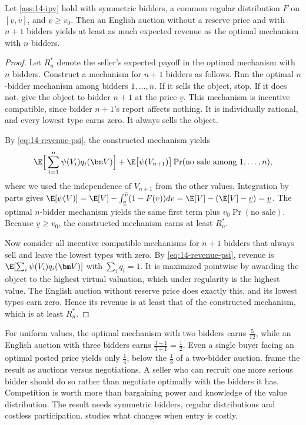 \begin{proposition}\label{prop:14-bk}
Let \cref{ass:14-ipv} hold with symmetric bidders, a common regular distribution $F$ on $[\underline v,\bar v]$, and $\underline v\ge v_0$. Then an English auction without a reserve price and with $n+1$ bidders yields at least as much expected revenue as the optimal mechanism with $n$ bidders.
\end{proposition}

\begin{proof}
Let $R_n^*$ denote the seller's expected payoff in the optimal mechanism with $n$ bidders. Construct a mechanism for $n+1$ bidders as follows. Run the optimal $n$-bidder mechanism among bidders $1,\dots,n$. If it sells the object, stop. If it does not, give the object to bidder $n+1$ at the price $\underline v$. This mechanism is incentive compatible, since bidder $n+1$'s report affects nothing. It is individually rational, and every lowest type earns zero. It always sells the object.

By \eqref{eq:14-revenue-psi}, the constructed mechanism yields
\[
\E\Big[\sum_{i=1}^n\psi(V_i)q_i(\bm V)\Big]+\E\big[\psi(V_{n+1})\big]\Pr(\text{no sale among }1,\dots,n),
\]
where we used the independence of $V_{n+1}$ from the other values. Integration by parts gives $\E[\psi(V)]=\E[V]-\int_{\underline v}^{\bar v}(1-F(v))dv=\E[V]-(\E[V]-\underline v)=\underline v$. The optimal $n$-bidder mechanism yields the same first term plus $v_0\Pr(\text{no sale})$. Because $\underline v\ge v_0$, the constructed mechanism earns at least $R_n^*$.

Now consider all incentive compatible mechanisms for $n+1$ bidders that always sell and leave the lowest types with zero. By \eqref{eq:14-revenue-psi}, revenue is $\E[\sum_i\psi(V_i)q_i(\bm V)]$ with $\sum_iq_i=1$. It is maximized pointwise by awarding the object to the highest virtual valuation, which under regularity is the highest value. The English auction without reserve price does exactly this, and its lowest types earn zero. Hence its revenue is at least that of the constructed mechanism, which is at least $R_n^*$.
\end{proof}

For uniform values, the optimal mechanism with two bidders earns $\frac{5}{12}$, while an English auction with three bidders earns $\frac{3-1}{3+1}=\frac12$. Even a single buyer facing an optimal posted price yields only $\frac14$, below the $\frac13$ of a two-bidder auction.  frame the result as auctions versus negotiations. A seller who can recruit one more serious bidder should do so rather than negotiate optimally with the bidders it has. Competition is worth more than bargaining power and knowledge of the value distribution. The result needs symmetric bidders, regular distributions and costless participation.  studies what changes when entry is costly.

